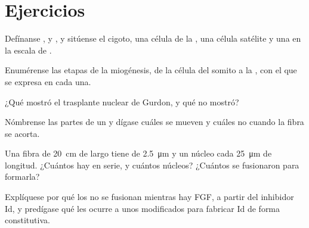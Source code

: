 \section{Ejercicios}

\begin{exercise}[$\star$]\label{exo:b2:cell-differentiation:1}
Defínanse ,  y , y sitúense el cigoto,
una célula de la , una célula satélite y una  en la escala de .
\end{exercise}

\begin{exercise}[$\star$]\label{exo:b2:cell-differentiation:2}
Enumérense las etapas de la miogénesis, de la célula del somito a la , con el  que se expresa en cada una.
\end{exercise}

\begin{exercise}[$\star$]\label{exo:b2:cell-differentiation:3}
¿Qué mostró el trasplante nuclear de Gurdon, y qué no mostró?
\end{exercise}

\begin{exercise}[$\star$]\label{exo:b2:cell-differentiation:4}
Nómbrense las partes de un  y dígase cuáles se mueven y cuáles no
cuando la fibra se acorta.
\end{exercise}

\begin{exercise}[$\star\star$]\label{exo:b2:cell-differentiation:5}
Una fibra de \qty{20}{cm} de largo tiene  de \qty{2.5}{\micro m}
y un núcleo cada \qty{25}{\micro m} de longitud. ¿Cuántos  hay
en serie, y cuántos núcleos? ¿Cuántos  se fusionaron para
formarla?
\end{exercise}

\begin{exercise}[$\star\star$]\label{exo:b2:cell-differentiation:6}
Explíquese por qué los  no se fusionan mientras hay FGF, a
partir del inhibidor Id, y predígase qué les ocurre a unos 
modificados para fabricar Id de forma constitutiva.
\end{exercise}

